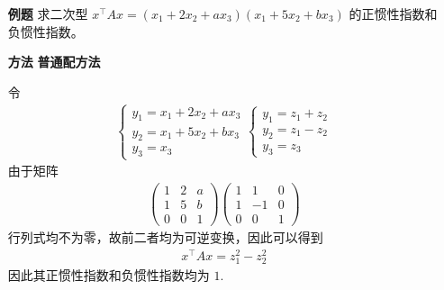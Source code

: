 \begin{enumerate}
    \item[\textbf{例题}] 
    求二次型 $ x^\top Ax = (x_1 + 2x_2 + ax_3)(x_1 + 5x_2 + bx_3) $ 的正惯性指数和负惯性指数。
    \item[\textbf{方法}] \textbf{普通配方法}
    
    令
    \begin{equation*}
        \begin{aligned}
            \begin{cases}
                y_1 = x_1 + 2x_2 + ax_3\\
                y_2 = x_1 + 5x_2 + bx_3\\
                y_3 = x_3
            \end{cases}
            \begin{cases}
                y_1 = z_1 + z_2\\
                y_2 = z_1 - z_2\\ 
                y_3 = z_3
            \end{cases}
        \end{aligned}
    \end{equation*}
    由于矩阵
    \begin{equation*}
        \begin{aligned}
            \begin{pmatrix}
                1&2&a\\1&5&b\\0&0&1
            \end{pmatrix}
            \begin{pmatrix}
                1&1&0\\1&-1&0\\0&0&1
            \end{pmatrix}
        \end{aligned}
    \end{equation*}
    行列式均不为零，故前二者均为可逆变换，因此可以得到
    \begin{equation*}
        \begin{aligned}
            x^\top Ax = z_1^2 - z_2^2
        \end{aligned}
    \end{equation*}
    因此其正惯性指数和负惯性指数均为 $ 1. $ 
\end{enumerate}

